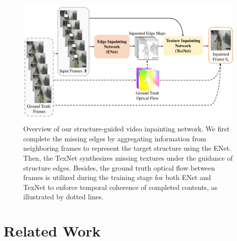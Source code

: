 \begin{figure}[t]
	\centering
	\includegraphics[width=1.01\columnwidth]{zong} %
	\caption{Overview of our structure-guided video inpainting network. We first complete the missing edges by aggregating information from neighboring frames to represent the target structure using the ENet. Then, the TexNet synthesizes missing textures under the guidance of structure edges. Besides, the ground truth optical flow between frames is utilized during the training stage for both ENet and TexNet to enforce temporal coherence of completed contents, as illustrated by dotted lines.}
	\label{fig:overview}
\end{figure}






\section{Related Work}
